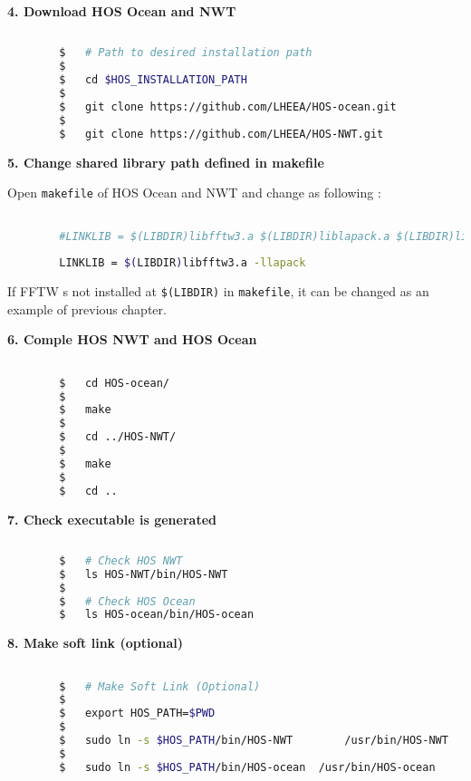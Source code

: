 		\vspace{0.2cm}
		\textbf{4. Download HOS Ocean and NWT}
		
		\begin{lstlisting}[language=bash]
		
		$	# Path to desired installation path
		$
		$	cd $HOS_INSTALLATION_PATH
		$
		$	git clone https://github.com/LHEEA/HOS-ocean.git
		$
		$	git clone https://github.com/LHEEA/HOS-NWT.git		
		\end{lstlisting}
		
		\vspace{0.2cm}
		\textbf{5. Change shared library path defined in makefile}
		
		Open \texttt{makefile} of HOS Ocean and NWT and change as following : 
		
		\begin{lstlisting}[language=bash]

		#LINKLIB = $(LIBDIR)libfftw3.a $(LIBDIR)liblapack.a $(LIBDIR)librefblas.a
		
		LINKLIB = $(LIBDIR)libfftw3.a -llapack
		\end{lstlisting}
		
		If FFTW s not installed at \texttt{\$(LIBDIR)} in \texttt{makefile}, it can be changed as an example of previous chapter. 
		
		\pagebreak
		
		\vspace{0.2cm}
		\textbf{6. Comple HOS NWT and HOS Ocean}
		
		\begin{lstlisting}[language=bash]

		$	cd HOS-ocean/
		$
		$	make
		$	
		$	cd ../HOS-NWT/
		$
		$	make
		$
		$	cd ..		
		\end{lstlisting}
		
		\vspace{0.2cm}
		\textbf{7. Check executable is generated}
		
		\begin{lstlisting}[language=bash]
		
		$	# Check HOS NWT
		$	ls HOS-NWT/bin/HOS-NWT
		$
		$	# Check HOS Ocean
		$	ls HOS-ocean/bin/HOS-ocean
		\end{lstlisting}
		
		\vspace{0.2cm}
		\textbf{8. Make soft link (optional)}
		
		\begin{lstlisting}[language=bash]

		$	# Make Soft Link (Optional)
		$
		$	export HOS_PATH=$PWD
		$
		$	sudo ln -s $HOS_PATH/bin/HOS-NWT		/usr/bin/HOS-NWT
		$
		$	sudo ln -s $HOS_PATH/bin/HOS-ocean	/usr/bin/HOS-ocean
		\end{lstlisting}

